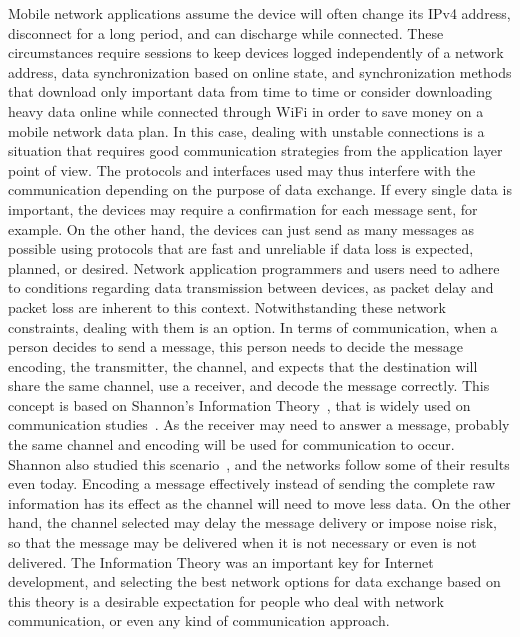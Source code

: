 Mobile network applications assume the device will often change its IPv4 address, disconnect for a long period, and can discharge while connected.
These circumstances require sessions to keep devices logged independently of a network address, data synchronization based on online state, and synchronization methods that download only important data from time to time or consider downloading heavy data online while connected through WiFi in order to save money on a mobile network data plan.
In this case, dealing with unstable connections is a situation that requires good communication strategies from the application layer point of view.
The protocols and interfaces used may thus interfere with the communication depending on the purpose of data exchange.
If every single data is important, the devices may require a confirmation for each message sent, for example.
On the other hand, the devices can just send as many messages as possible using protocols that are fast and unreliable if data loss is expected, planned, or desired.
Network application programmers and users need to adhere to conditions regarding data transmission between devices, as packet delay and packet loss are inherent to this context.
Notwithstanding these network constraints, dealing with them is an option.
In terms of communication, when a person decides to send a message, this person needs to decide the message encoding, the transmitter, the channel, and expects that the destination will share the same channel, use a receiver, and decode the message correctly.
This concept is based on Shannon's Information Theory~\citep{Shannon1948mathematical}, that is widely used on communication studies~\citep{Fiske2010introduction}.
As the receiver may need to answer a message, probably the same channel and encoding will be used for communication to occur.
Shannon also studied this scenario~\citep{Shannon1961two}, and the networks follow some of their results even today.
Encoding a message effectively instead of sending the complete raw information has its effect as the channel will need to move less data.
On the other hand, the channel selected may delay the message delivery or impose noise risk, so that the message may be delivered when it is not necessary or even is not delivered.
The Information Theory was an important key for Internet development, and selecting the best network options for data exchange based on this theory is a desirable expectation for people who deal with network communication, or even any kind of communication approach.

